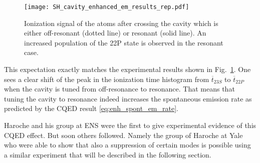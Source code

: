 \begin{figure}[t]
  \centering
  \texttt{[image: SH\_cavity\_enhanced\_em\_results\_rep.pdf]}
  \caption{Ionization signal of the atoms after crossing the cavity which is either
  off-resonant (dotted line) or resonant (solid line). An increased population
of the 22P state is observed in the resonant case.}
  \label{fig:SH_cavity_enhanced_em_results_rep}
\end{figure}
This expectation exactly matches the experimental results shown in
Fig.~\ref{fig:SH_cavity_enhanced_em_results_rep}. One sees a clear shift of the
peak in the ionization time histogram from $\overline{t}_{23S}$ to
$\overline{t}_{22P}$ when the cavity is tuned from off-resonance to resonance.
That means that tuning the cavity to resonance indeed increases the spontaneous
emission rate as predicted by the CQED result \eqref{eq:enh_spont_em_rate}.


Haroche and his group at ENS were the first to give experimental evidence of
this CQED effect. But soon others followed. Namely the group of Haroche at Yale
who were able to show that also a suppression of certain modes is possible
using a similar experiment that will be described in the following section.

